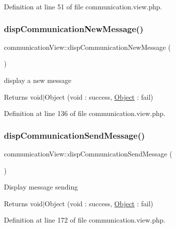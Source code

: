 Definition at line 51 of file communication.\+view.\+php.

\hypertarget{classcommunicationView_a3f0afc676b2ea9ee123f86fc362aeb19}{}\label{classcommunicationView_a3f0afc676b2ea9ee123f86fc362aeb19} 
\subsubsection{\texorpdfstring{disp\+Communication\+New\+Message()}{dispCommunicationNewMessage()}}
{\footnotesize\ttfamily communication\+View\+::disp\+Communication\+New\+Message (\begin{DoxyParamCaption}{ }\end{DoxyParamCaption})}

display a new message \begin{DoxyReturn}{Returns}
void$\vert$\+Object (void \+: success, \hyperlink{classObject}{Object} \+: fail) 
\end{DoxyReturn}


Definition at line 136 of file communication.\+view.\+php.

\hypertarget{classcommunicationView_a7c9525d8c0851708e5b768df15e61bf6}{}\label{classcommunicationView_a7c9525d8c0851708e5b768df15e61bf6} 
\subsubsection{\texorpdfstring{disp\+Communication\+Send\+Message()}{dispCommunicationSendMessage()}}
{\footnotesize\ttfamily communication\+View\+::disp\+Communication\+Send\+Message (\begin{DoxyParamCaption}{ }\end{DoxyParamCaption})}

Display message sending \begin{DoxyReturn}{Returns}
void$\vert$\+Object (void \+: success, \hyperlink{classObject}{Object} \+: fail) 
\end{DoxyReturn}


Definition at line 172 of file communication.\+view.\+php.

